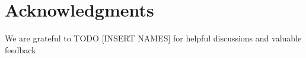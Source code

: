 \section{Acknowledgments}
We are grateful to TODO [INSERT NAMES]
for helpful discussions and valuable feedback
